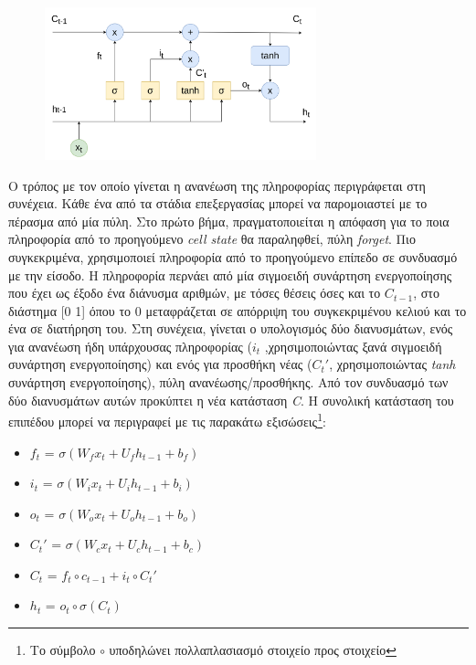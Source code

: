 \begin{figure}[!ht]
  \centering
  \captionsetup{justification=centering}
  \includegraphics[width=0.7\textwidth]{images/chapter2/lstm-arch.png}
  \label{fig:lstm-arch}
\end{figure}
\noindent

Ο τρόπος με τον οποίο γίνεται η ανανέωση της πληροφορίας περιγράφεται στη συνέχεια. Κάθε ένα από τα στάδια επεξεργασίας μπορεί να παρομοιαστεί με το πέρασμα από μία πύλη. Στο πρώτο βήμα, πραγματοποιείται η απόφαση για το ποια πληροφορία από το προηγούμενο \emph{cell state} θα παραληφθεί, πύλη \emph{forget}. Πιο συγκεκριμένα, χρησιμοποιεί πληροφορία από το προηγούμενο επίπεδο σε συνδυασμό με την είσοδο. Η πληροφορία περνάει από μία σιγμοειδή συνάρτηση ενεργοποίησης που έχει ως έξοδο ένα διάνυσμα αριθμών, με τόσες θέσεις όσες και το $C_{t-1}$, στο διάστημα [0 1] όπου το 0 μεταφράζεται σε απόρριψη του συγκεκριμένου κελιού και το ένα σε διατήρηση του. Στη συνέχεια, γίνεται ο υπολογισμός δύο διανυσμάτων, ενός για ανανέωση ήδη υπάρχουσας πληροφορίας ($i_t$ ,χρησιμοποιώντας ξανά σιγμοειδή συνάρτηση ενεργοποίησης) και ενός για προσθήκη νέας ($C_t'$, χρησιμοποιώντας \emph{tanh} συνάρτηση ενεργοποίησης), πύλη ανανέωσης/προσθήκης. Από τον συνδυασμό των δύο διανυσμάτων αυτών προκύπτει η νέα κατάσταση \emph{C}. Η συνολική κατάσταση του επιπέδου μπορεί να περιγραφεί με τις παρακάτω εξισώσεις\footnote{Το σύμβολο $\circ$ υποδηλώνει πολλαπλασιασμό στοιχείο προς στοιχείο}:
\begin{itemize}
    \item $f_t$ = $\sigma(W_f x_t + U_f h_{t-1} + b_f)$
    \item $i_t$ = $\sigma(W_i x_t + U_i h_{t-1} + b_i)$
    \item $o_t$ = $\sigma(W_o x_t + U_o h_{t-1} + b_o)$
    \item $C_t'$ = $\sigma(W_c x_t + U_c h_{t-1} + b_c)$
    \item $C_t$ = $f_t \circ c_{t-1} + i_t \circ C_t'$
    \item $h_t$ = $o_t \circ \sigma(C_t)$
\end{itemize}

